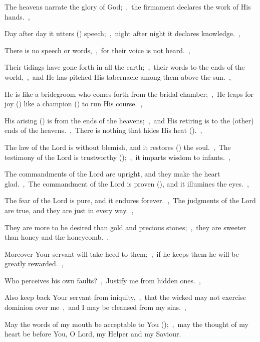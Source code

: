 \documentclass[12pt,twoside,a5paper]{article}
\begin{document}



\begin{normalparskip}
  The heavens narrate the glory of God;~\sep\ the firmament declares the work of His hands.~\sep


  Day after day it utters () speech;~\sep\ night after night it declares knowledge.~\sep

  There is no speech or words,~\sep\ for their voice is not heard.~\sep

  Their tidings have gone forth in all the earth;~\sep\ their words to the ends of the world,~\sep\ and He has pitched His tabernacle among them above the sun.~\sep

  He is like a bridegroom who comes forth from the bridal chamber;~\sep\ He leaps for joy () like a champion () to run His course.~\sep

  His arising () is from the ends of the heavens;~\sep\ and His retiring is to the (other) ends of the heavens.~\sep\ There is nothing that hides His heat ().~\sep

  The law of the Lord is without blemish, and it restores () the soul.~\sep\ The testimony of the Lord is trustworthy ();~\sep\ it imparts wisdom to infants.~\sep

  The commandments of the Lord are upright, and they make the heart glad.~\sep\ The commandment of the Lord is proven (), and it illumines the eyes.~\sep

  The fear of the Lord is pure, and it endures forever.~\sep\ The judgments of the Lord are true, and they are just in every way.~\sep

  They are more to be desired than gold and precious stones;~\sep\ they are sweeter than honey and the honeycomb.~\sep

  Moreover Your servant will take heed to them;~\sep\ if he keeps them he will be greatly rewarded.~\sep

  Who perceives his own faults?~\sep\ Justify me from hidden ones.~\sep

  Also keep back Your servant from iniquity,~\sep\ that the wicked may not exercise dominion over me~\sep\ and I may be cleansed from my sins.~\sep

  May the words of my mouth be acceptable to You ();~\sep\ may the thought of my heart be before You, O Lord, my Helper and my Saviour.
\end{normalparskip}
\end{document}
